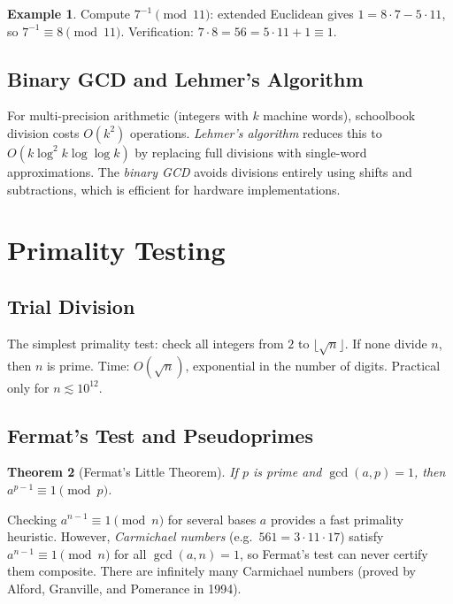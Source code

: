 \documentclass[12pt,a4paper]{amsart}
\newtheorem{theorem}{Theorem}[section]
\theoremstyle{definition}
\newtheorem{example}[theorem]{Example}
\begin{document}
\begin{example}
Compute $7^{-1} \pmod{11}$: extended Euclidean gives $1 = 8\cdot 7 - 5\cdot 11$,
so $7^{-1} \equiv 8 \pmod{11}$. Verification: $7 \cdot 8 = 56 = 5\cdot 11 + 1 \equiv 1$.
\end{example}

\subsection{Binary GCD and Lehmer's Algorithm}

For multi-precision arithmetic (integers with $k$ machine words), schoolbook
division costs $O(k^2)$ operations. \emph{Lehmer's algorithm} reduces this to
$O(k\log^2 k\log\log k)$ by replacing full divisions with single-word
approximations. The \emph{binary GCD} avoids divisions entirely using shifts and
subtractions, which is efficient for hardware implementations.

\section{Primality Testing}

\subsection{Trial Division}

The simplest primality test: check all integers from $2$ to $\lfloor\sqrt{n}\rfloor$.
If none divide $n$, then $n$ is prime. Time: $O(\sqrt{n})$, exponential in the
number of digits. Practical only for $n \lesssim 10^{12}$.

\subsection{Fermat's Test and Pseudoprimes}

\begin{theorem}[Fermat's Little Theorem]
If $p$ is prime and $\gcd(a,p)=1$, then $a^{p-1} \equiv 1 \pmod{p}$.
\end{theorem}

Checking $a^{n-1} \equiv 1 \pmod{n}$ for several bases $a$ provides a fast
primality heuristic. However, \emph{Carmichael numbers} (e.g.\ $561 = 3\cdot11\cdot17$)
satisfy $a^{n-1}\equiv 1\pmod{n}$ for all $\gcd(a,n)=1$, so Fermat's test
can never certify them composite. There are infinitely many Carmichael numbers
(proved by Alford, Granville, and Pomerance in 1994).
\end{document}
